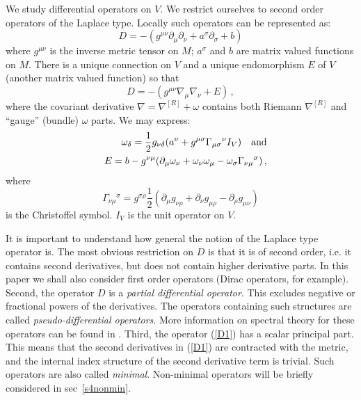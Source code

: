 We study differential
operators on $V$. We restrict ourselves to second order
operators of the Laplace type. Locally such operators can
be represented as:
\begin{equation}
D=-(g^{\mu\nu}\partial_\mu\partial_\nu 
+a^\sigma\partial_\sigma +b) \label{D1}
\end{equation}
where $g^{\mu\nu}$ is the inverse metric tensor on $M$;
$a^\sigma$ and $b$ are matrix valued functions on $M$.
There is a unique connection on $V$ and a unique 
endomorphism $E$ of $V$ (another matrix valued function)
so that
\begin{equation}D=-(g^{\mu\nu}\nabla_\mu\nabla_\nu +E)\, ,
\label{laplaceb}\end{equation}
where the covariant derivative $\nabla =\nabla^{[R]} +\omega$
contains both Riemann $\nabla^{[R]}$ and ``gauge'' (bundle) $\omega$
parts.
We may express:
\begin{eqnarray}
    &&\omega_\delta=\frac 12 g_{\nu\delta}(a^\nu+g^{\mu\sigma}\Gamma_{\mu
    \sigma}{}^{\nu }I_{V}) \quad{\rm and}\label{oab}\\
    &&E=b-g^{\nu \mu}(
    \partial_\mu\omega_\nu+\omega_\nu\omega_\mu
     -\omega_\sigma\Gamma_{\nu\mu}{}^\sigma)\,, \label{Eab}
\end{eqnarray}
where
\begin{equation}
\Gamma_{\nu\mu}{}^\sigma =g^{\sigma\rho} \frac 12 \left(
\partial_\mu g_{\nu\rho}+\partial_\nu g_{\mu\rho} -
\partial_\rho g_{\mu\nu} \right) \label{Christ}
\end{equation}
is the Christoffel symbol. 
$I_{V}$ is the unit operator on $V$. 

It is important to understand how general the notion of the Laplace
type operator is. The most obvious restriction on $D$ is that it is
of second order, i.e. it contains second derivatives, but does not
contain higher derivative parts. In this paper we shall also consider
first order operators (Dirac operators, for example). Second, the
operator $D$ is a {\it partial differential operator}. This excludes
negative or fractional powers of the derivatives. The operators containing
such structures are called {\it pseudo-differential operators}.
More information on spectral theory for these operators can be found
in \cite{Seeley:1968,Grubb:1996,Grubb:2002}. 
Third, the operator (\ref{D1}) has a
scalar principal part. This means that the second derivatives in
(\ref{D1}) are contracted with the metric, and the internal index structure
of the second derivative term is trivial. Such operators are also
called {\it minimal}. Non-minimal operators will be briefly
considered in sec\ \ref{s4nonmin}.

